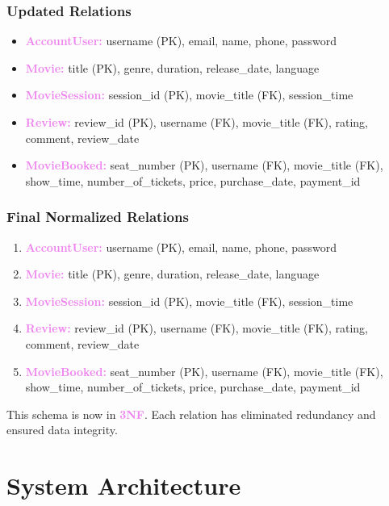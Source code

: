 \documentclass[a4paper,12pt]{article}  %
\renewcommand{\textbf}[1]{\textcolor{violet}{\bfseries #1}}
\begin{document}
\subsubsection*{Updated Relations}

\begin{itemize}
    \item \textbf{AccountUser:} username (PK), email, name, phone, password
    \item \textbf{Movie:} title (PK), genre, duration, release\_date, language
    \item \textbf{MovieSession:} session\_id (PK), movie\_title (FK), session\_time
    \item \textbf{Review:} review\_id (PK), username (FK), movie\_title (FK), rating, comment, review\_date
    \item \textbf{MovieBooked:} seat\_number (PK), username (FK), movie\_title (FK), show\_time, number\_of\_tickets, price, purchase\_date, payment\_id
\end{itemize}

\subsubsection*{Final Normalized Relations}

\begin{enumerate}
    \item \textbf{AccountUser:} username (PK), email, name, phone, password
    \item \textbf{Movie:} title (PK), genre, duration, release\_date, language
    \item \textbf{MovieSession:} session\_id (PK), movie\_title (FK), session\_time
    \item \textbf{Review:} review\_id (PK), username (FK), movie\_title (FK), rating, comment, review\_date
    \item \textbf{MovieBooked:} seat\_number (PK), username (FK), movie\_title (FK), show\_time, number\_of\_tickets, price, purchase\_date, payment\_id
\end{enumerate}

This schema is now in \textbf{3NF}. Each relation has eliminated redundancy and ensured data integrity.


\newpage

\clearpage




\section{System Architecture} \label{sec:sa}
\end{document}
